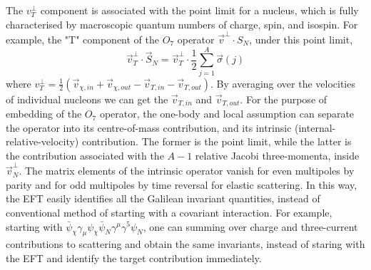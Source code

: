 \documentclass[12pt]{article}
\begin{document}
The $v_T^\bot$ component is associated with the point limit for a nucleus, which is fully characterised by macroscopic quantum numbers of charge, spin, and isospin. For example,  the "T" component of the $O_7$ operator $\vec v ^\bot \cdot S_N$, under this point limit,  
$$
\vec v_T^\bot \cdot \vec S_N = \vec v_T^\bot \cdot \frac{1}{2} \sum_{j=1}^A \vec \sigma(j) 
$$
where $ v_T^\bot = \frac{1}{2}(\vec v_{\chi,in} +\vec v_{\chi,out}-\vec v_{T,in}-\vec v_{T,out})$. By averaging over the velocities of individual nucleons we can get the $\vec v_{T,in}$ and $\vec v_{T,out}$. For the purpose of embedding of the $O_7$ operator, the one-body and local assumption can separate the operator into its centre-of-mass contribution, and its intrinsic (internal-relative-velocity) contribution. The former is the point limit, while the latter is the contribution associated with the $A-1$ relative Jacobi three-momenta,  inside $\vec v_N^\bot$.  The matrix elements of the intrinsic operator vanish for even multipoles by parity and for odd multipoles by time reversal for elastic scattering. In this way, the EFT easily identifies all the Galilean invariant quantities, instead of conventional method of starting with a covariant interaction. For example, starting with $\bar \psi_\chi \gamma_\mu \psi_\chi \bar \psi_N \gamma^\mu \gamma^5 \psi_N$, one can summing over charge and three-current contributions to scattering and obtain the same invariants, instead of staring with the EFT and identify the target contribution immediately. 
\end{document}
